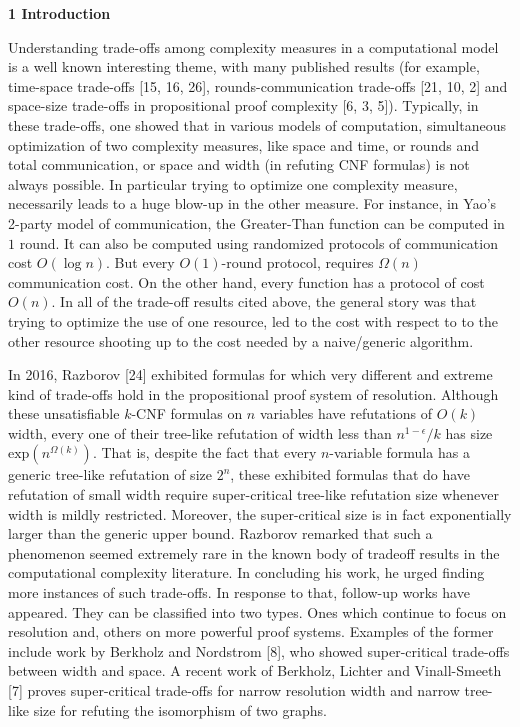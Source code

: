 

\par\medskip\noindent\textbf{
1 Introduction}\par




Understanding trade-offs among complexity measures in a computational model is a well known interesting theme, with many published results (for example, time-space trade-offs [15, 16, 26], rounds-communication trade-offs [21, 10, 2] and space-size trade-offs in propositional proof complexity [6, 3, 5]). Typically, in these trade-offs, one showed that in various models of computation, simultaneous optimization of two complexity measures, like space and time, or rounds and total communication, or space and width (in refuting CNF formulas) is not always possible. In particular trying to optimize one complexity measure, necessarily leads to a huge blow-up in the other measure. For instance, in Yao’s 2-party model of communication, the Greater-Than function can be computed in $1$ round. It can also be computed using randomized protocols of communication cost $O(\log n)$. But every $O(1)$-round protocol, requires $\Omega(n)$ communication cost. On the other hand, every function has a protocol of cost $O(n)$. In all of the trade-off results cited above, the general story was that trying to optimize the use of one resource, led to the cost with respect to to the other resource shooting up to the cost needed by a naive/generic algorithm.\par




In 2016, Razborov [24] exhibited formulas for which very different and extreme kind of trade-offs hold in the propositional proof system of resolution. Although these unsatisfiable $k$-CNF formulas on $n$ variables have refutations of $O(k)$ width, every one of their tree-like refutation of width less than $n^{1-\epsilon}/k$ has size $\text{exp}(n^{\Omega(k)})$. That is, despite the fact that every $n$-variable formula has a generic tree-like refutation of size $2^{n}$, these exhibited formulas that do have refutation of small width require super-critical tree-like refutation size whenever width is mildly restricted. Moreover, the super-critical size is in fact exponentially larger than the generic upper bound. Razborov remarked that such a phenomenon seemed extremely rare in the known body of tradeoff results in the computational complexity literature. In concluding his work, he urged finding more instances of such trade-offs. In response to that, follow-up works have appeared. They can be classified into two types. Ones which continue to focus on resolution and, others on more powerful proof systems. Examples of the former include work by Berkholz and Nordstrom [8], who showed super-critical trade-offs between width and space. A recent work of Berkholz, Lichter and Vinall-Smeeth [7] proves super-critical trade-offs for narrow resolution width and narrow tree-like size for refuting the isomorphism of two graphs.\par




